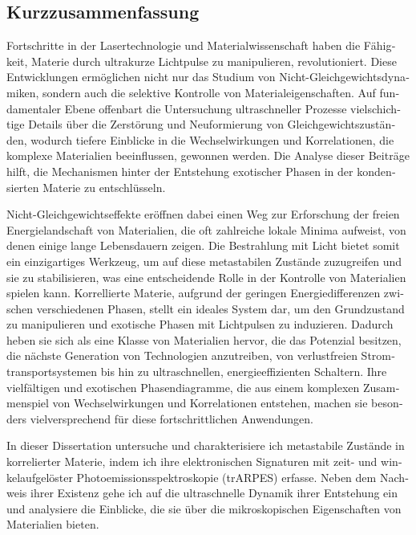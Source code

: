 \begin{otherlanguage}{german}
\cleardoublepage
\chapter*{Kurzzusammenfassung}
Fortschritte in der Lasertechnologie und Materialwissenschaft haben die Fähigkeit, Materie durch ultrakurze Lichtpulse zu manipulieren, revolutioniert.
Diese Entwicklungen ermöglichen nicht nur das Studium von Nicht-Gleichgewichtsdynamiken, sondern auch die selektive Kontrolle von Materialeigenschaften.
Auf fundamentaler Ebene offenbart die Untersuchung ultraschneller Prozesse vielschichtige Details über die Zerstörung und Neuformierung von Gleichgewichtszuständen, wodurch tiefere Einblicke in die Wechselwirkungen und Korrelationen, die komplexe Materialien beeinflussen, gewonnen werden.
Die Analyse dieser Beiträge hilft, die Mechanismen hinter der Entstehung exotischer Phasen in der kondensierten Materie zu entschlüsseln.

Nicht-Gleichgewichtseffekte eröffnen dabei einen Weg zur Erforschung der freien Energielandschaft von Materialien, die oft zahlreiche lokale Minima aufweist, von denen einige lange Lebensdauern zeigen.
Die Bestrahlung mit Licht bietet somit ein einzigartiges Werkzeug, um auf diese metastabilen Zustände zuzugreifen und sie zu stabilisieren, was eine entscheidende Rolle in der Kontrolle von Materialien spielen kann.
Korrellierte Materie, aufgrund der geringen Energiedifferenzen zwischen verschiedenen Phasen, stellt ein ideales System dar, um den Grundzustand zu manipulieren und exotische Phasen mit Lichtpulsen zu induzieren.
Dadurch heben sie sich als eine Klasse von Materialien hervor, die das Potenzial besitzen, die nächste Generation von Technologien anzutreiben, von verlustfreien Stromtransportsystemen bis hin zu ultraschnellen, energieeffizienten Schaltern.
Ihre vielfältigen und exotischen Phasendiagramme, die aus einem komplexen Zusammenspiel von Wechselwirkungen und Korrelationen entstehen, machen sie besonders vielversprechend für diese fortschrittlichen Anwendungen. \hfill\break

In dieser Dissertation untersuche und charakterisiere ich metastabile Zustände in korrelierter Materie, indem ich ihre elektronischen Signaturen mit zeit- und winkelaufgelöster Photoemissionsspektroskopie (trARPES) erfasse.
Neben dem Nachweis ihrer Existenz gehe ich auf die ultraschnelle Dynamik ihrer Entstehung ein und analysiere die Einblicke, die sie über die mikroskopischen Eigenschaften von Materialien bieten. \hfill\break


\end{otherlanguage}
